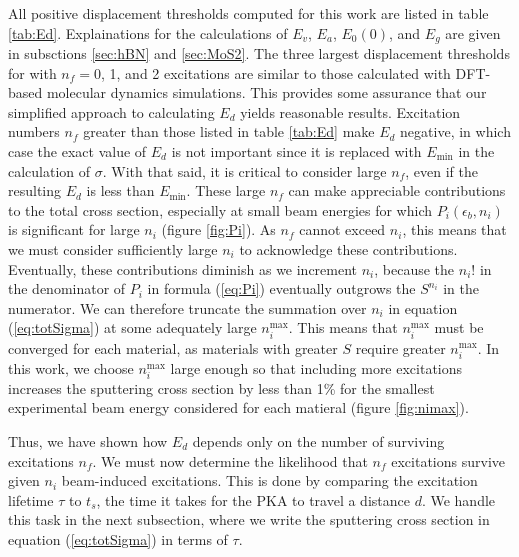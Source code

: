 \documentclass[twoside,twocolumn,9pt]{article}
\begin{document}
All positive displacement thresholds computed for this work are listed in table
\ref{tab:Ed}.
Explainations for the calculations of $E_v$, $E_a$, $E_0(0)$, and $E_g$ are
given in subsctions \ref{sec:hBN} and \ref{sec:MoS2}.
The three largest displacement thresholds for  with $n_f = 0$, 1, and 2
excitations are similar to those calculated with DFT-based molecular dynamics
simulations.\cite{Kretschmer2020}
This provides some assurance that our simplified approach to calculating $E_d$
yields reasonable results.
Excitation numbers $n_f$ greater than those listed in table \ref{tab:Ed} make
$E_d$ negative, in which case the exact value of $E_d$ is not important since
it is replaced with $E_\text{min}$ in the calculation of $\sigma$.
With that said, it is critical to consider large $n_f$, even if the resulting
$E_d$ is less than $E_\text{min}$.
These large $n_f$ can make appreciable contributions to the total
cross section, especially at small beam energies for which $P_i(\epsilon_b,
n_i)$ is significant for large $n_i$ (figure \ref{fig:Pi}).
As $n_f$ cannot exceed $n_i$, this means that we must consider sufficiently
large $n_i$ to acknowledge these contributions.
Eventually, these contributions diminish as we increment $n_i$, because the
$n_i!$ in the denominator of $P_i$ in formula (\ref{eq:Pi}) eventually
outgrows the $S^{n_i}$ in the numerator.
We can therefore truncate the summation over $n_i$ in equation
(\ref{eq:totSigma}) at some adequately large $n_i^\text{max}$.
This means that $n_i^\text{max}$ must be converged for each material, as
materials with greater $S$ require greater $n_i^\text{max}$.
In this work, we choose $n_i^\text{max}$ large enough so that including more
excitations increases the sputtering cross section by less than 1\% for the
smallest experimental beam energy considered for each matieral (figure
\ref{fig:nimax}).

Thus, we have shown how $E_d$ depends only on the number of surviving
excitations $n_f$.  We must now determine the likelihood that $n_f$ excitations
survive given $n_i$ beam-induced excitations.
This is done by comparing the excitation lifetime $\tau$ to $t_s$, the time it
takes for the PKA to travel a distance $d$.
We handle this task in the next subsection, where we write the sputtering
cross section in equation (\ref{eq:totSigma}) in terms of
$\tau$.
\end{document}
